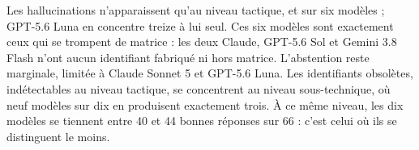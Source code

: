

Les hallucinations n'apparaissent qu'au niveau tactique, et sur six modèles ; GPT-5.6 Luna en concentre treize à lui seul. Ces six modèles sont exactement ceux qui se trompent de matrice : les deux Claude, GPT-5.6 Sol et Gemini 3.8 Flash n'ont aucun identifiant fabriqué ni hors matrice. L'abstention reste marginale, limitée à Claude Sonnet 5 et GPT-5.6 Luna. Les identifiants obsolètes, indétectables au niveau tactique, se concentrent au niveau sous-technique, où neuf modèles sur dix en produisent exactement trois. À ce même niveau, les dix modèles se tiennent entre 40 et 44 bonnes réponses sur 66 : c'est celui où ils se distinguent le moins.


